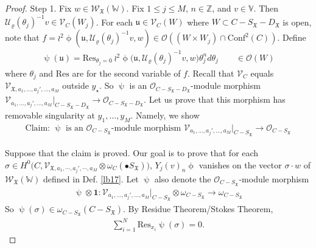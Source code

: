 \documentclass[11pt,b5paper,notitlepage]{article}
\theoremstyle{definition}
\theoremstyle{plain}
\newcommand{\fk}{\mathfrak}
\newcommand{\mc}{\mathcal}
\newcommand{\idt}{\mathbf{1}}
\newcommand{\Conf}{\mathrm{Conf}}
\newcommand{\Res}{\mathrm{Res}}
\newcommand{\SV}{\mathscr{V}}
\newcommand{\scr}{\mathscr}
\newcommand{\SX}{{S_{\fk X}}}
\newcommand{\DX}{D_{\fk X}}
\newcommand{\blt}{\bullet}
\newcommand{\Vbb}{\mathbb V}
\newcommand{\Wbb}{\mathbb W}
\newcommand{\Zbb}{\mathbb Z}
\newcommand{\<}{\left\langle}
\renewcommand{\>}{\right\rangle}
\newcommand{\fx}{\mathfrak{X}}
\numberwithin{equation}{section}
\begin{document}
    \begin{proof}

Step 1. Fix $w\in\scr W_{\fk X}(\Wbb)$. Fix $1\leq j\leq M$,  $n\in\Zbb$, and $v\in\Vbb$. Then $\mc U_\varrho(\theta_j)^{-1}v\in\scr V_C(W_j)$.        For each $\fk u\in\SV_C(W)$ where $W\subset C-S_\fx-D_\fx$ is open,  note that $f=\wr^2\upphi(\fk u,\mc U_\varrho(\theta_j)^{-1}v,w)\in\mc O((W\times W_j)\cap\Conf^2(C))$. Define
\begin{gather}
\uppsi(\fk u)=\Res_{\theta_j=0} ~{\wr^2\upphi}\big(\fk u,\mc U_\varrho(\theta_j)^{-1}v,w\big)\theta_j^n d\theta_j \qquad \in\mc O(W) \label{eq71}
\end{gather}
where $\theta_j$ and $\Res$ are for the second variable of $f$. Recall that $\scr V_C$ equals $\scr V_{\fk X,a_1,\dots,a_j',\dots,a_M}$ outside $y_\star$. So $\uppsi$ is an $\mc O_{C-\SX-\DX}$-module morphism $\scr V_{a_1,\dots,a_j',\dots,a_M}|_{C-\SX-\DX}\rightarrow \mc O_{C-\SX-\DX}$. Let us prove that this morphism has removable singularity at $y_1,\dots,y_M$. Namely, we show
\begin{gather}\label{claim31}
\text{Claim: $\uppsi$  is an $\mc O_{C-\SX}$-module morphism }\scr V_{a_1,\dots,a_j',\dots,a_M}|_{C-\SX}\rightarrow\mc O_{C-\SX}
\end{gather}

Suppose that the claim is proved. Our goal is to prove that for each $\sigma\in H^0\big(C,\SV_{\fx,a_1,\cdots,a_j',\cdots,a_M}\otimes \omega_C(\blt S_\fx)\big)$, $Y_j(v)_n\upphi$ vanishes on the vector $\sigma\cdot w$ of $\scr W_{\fk X}(\Wbb)$ defined in Def. \ref{lb17}. Let $\uppsi$ also denote the $\mc O_{C-\SX}$-module morphism
\begin{align*}
\uppsi\otimes\idt: \scr V_{a_1,\dots,a_j',\dots,a_M}|_{C-\SX}\otimes\omega_{C-\SX}\rightarrow\omega_{C-\SX}
\end{align*}
So $\uppsi(\sigma)\in\omega_{C-\SX}(C-\SX)$. By Residue Theorem/Stokes Theorem, 
\begin{align*}
\sum_{i=1}^N \Res_{x_i} \uppsi(\sigma)=0.
\end{align*}


\end{proof}
\end{document}
